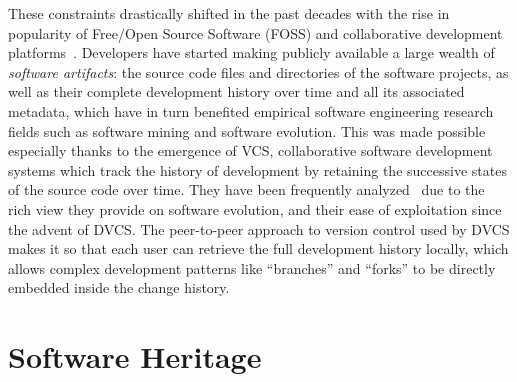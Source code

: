 These constraints drastically shifted in the past decades with the rise in
popularity of Free/Open Source Software (FOSS) and collaborative development
platforms~\cite{kalliamvakou2014promises}. Developers have started making
publicly available a large wealth of \emph{software artifacts}: the source code
files and directories of the software projects, as well as their complete
development history over time and all its associated metadata, which have in
turn benefited empirical software engineering research fields such as software
mining and software evolution. This was made possible especially thanks to the
emergence of \gls{VCS}, collaborative software development systems which track
the history of development by retaining the successive states of the source
code over time. They have been frequently analyzed~\cite{kagdi2007msrsurvey}
due to the rich view they provide on software evolution, and their ease of
exploitation since the advent of \gls{DVCS}. The peer-to-peer approach to
version control used by \gls{DVCS} makes it so that each user can retrieve the
full development history locally, which allows complex development patterns
like ``branches'' and ``forks'' to be directly embedded inside the change
history.

\section{Software Heritage}

\lipsum[3]
